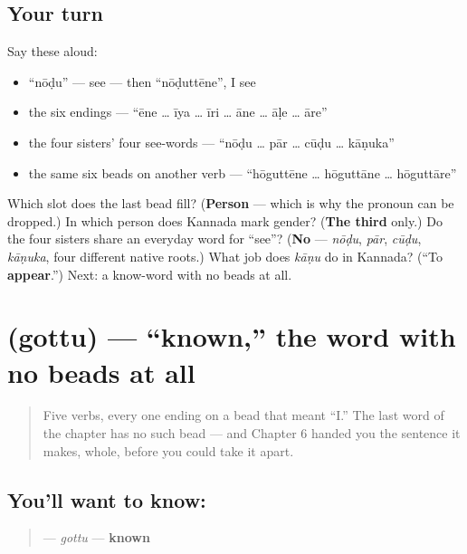 \subsection*{Your turn}
Say these aloud:

\begin{itemize}
\raggedright
  \item \textquotedblleft{}nōḍu\textquotedblright{} — see — then \textquotedblleft{}nōḍuttēne\textquotedblright{}, I see
  \item the six endings — \textquotedblleft{}ēne … īya … īri … āne … āḷe … āre\textquotedblright{}
  \item the four sisters' four see-words — \textquotedblleft{}nōḍu … pār … cūḍu … kāṇuka\textquotedblright{}
  \item the same six beads on another verb — \textquotedblleft{}hōguttēne … hōguttāne … hōguttāre\textquotedblright{}
\end{itemize}

\begin{tcolorbox}[breakable,colback=teal!4,colframe=teal!35!black,title={Before you move on}]
Which slot does the last bead fill? (\textbf{Person} — which is why the pronoun can be dropped.) In which person does Kannada mark gender? (\textbf{The third} only.) Do the four sisters share an everyday word for \textquotedblleft{}see\textquotedblright{}? (\textbf{No} — \emph{nōḍu}, \emph{pār}, \emph{cūḍu}, \emph{kāṇuka}, four different native roots.) What job does \emph{kāṇu} do in Kannada? (\textquotedblleft{}To \textbf{appear}.\textquotedblright{}) Next: a know-word with no beads at all.
\end{tcolorbox}
\section[\texorpdfstring{\kn{ಗೊತ್ತು} (gottu)}{ಗೊತ್ತು (gottu)}]{ (gottu) — \textquotedblleft{}known,\textquotedblright{} the word with no beads at all}

\label{lesson:KA-C32-gottu}



\begin{quote}
Five verbs, every one ending on a bead that meant \textquotedblleft{}I.\textquotedblright{} The last word of the chapter has no such bead — and Chapter 6 handed you the sentence it makes, whole, before you could take it apart.
\end{quote}

\subsection*{You'll want to know: }
\begin{quote}
\textbf{} — \emph{gottu} — \textbf{known}
\end{quote}

